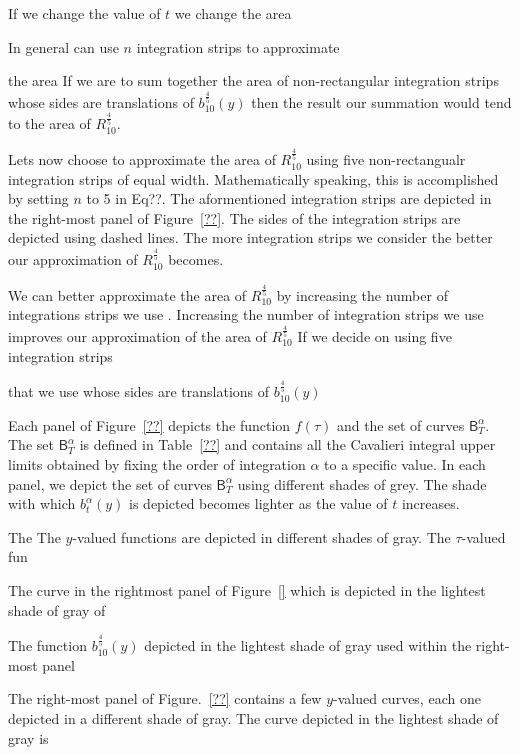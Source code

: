 \documentclass{article}
\theoremstyle{theorem}
\theoremstyle{definition}
\begin{document}
If we change the value of $t$ we change the area 


In general can use $n$ integration strips to approximate 



the area If we are to sum together the area of  non-rectangular integration strips whose sides are translations of $b_{10}^{\frac{4}{5}}(y)$ then the result our summation would tend to
the area of $R_{10}^{\frac{4}{5}}$. 


Lets now choose to approximate the area of $R_{10}^{\frac{4}{5}}$ using five non-rectangualr integration strips of equal width. Mathematically speaking, this is accomplished 
by setting $n$ to 5 in Eq??. The aformentioned integration strips are depicted in the right-most panel of Figure~\ref{??}.
The sides of the integration strips are depicted using dashed lines. The more integration strips we consider the better our approximation of $R_{10}^{\frac{4}{5}}$ becomes. 



We can better approximate the area of $R_{10}^{\frac{4}{5}}$ by increasing the number of integrations strips we use .   Increasing the number of integration strips we use improves our approximation of the area of $R_{10}^{\frac{4}{5}}$  
If we decide on using five integration strips 


that 
we use whose sides are translations of $b_{10}^{\frac{4}{5}}(y)$ 


Each panel of 
Figure~\ref{??} depicts the function $f(\tau)$ and the set of curves $\mathsf{B}_T^{\alpha}$. The set $\mathsf{B}_T^{\alpha}$ is defined in Table~\ref{??} and contains 
all the Cavalieri integral upper limits obtained by fixing the order of integration $\alpha$ to a specific value. In each panel, we depict the set of curves $\mathsf{B}_T^{\alpha}$ using different shades of grey. 
The shade with which $b_t^{\alpha}(y)$ is depicted becomes lighter as the value of $t$ increases.


The The $y$-valued functions are depicted in different shades of gray. The $\tau$-valued fun 

The curve in the rightmost panel of 
Figure~\ref{} which is depicted in the lightest shade of gray of 

The function $b_{10}^{\frac{4}{5}}(y)$ 
depicted in the lightest shade of gray used within the right-most panel


The right-most panel of Figure.~\ref{??} contains 
a few $y$-valued curves, each one depicted in a different shade of gray. The curve depicted in the lightest shade of gray is  
\end{document}
